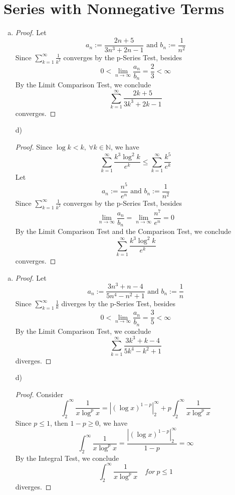 \documentclass{report}
\begin{document}
\section{Series with Nonnegative Terms}

\begin{Exercise}
\begin{enumerate}[a)]
\item 
\begin{proof}
Let $$a_n := \frac{2n+5}{3n^3+2n-1}\text{ and } b_n :=\frac{1}{n^2}$$
Since $\sum_{k=1}^{\infty}\frac{1}{k^2}$ converges by the p-Series Test, besides
$$0<\lim_{n\to\infty}\frac{a_n}{b_n} = \frac{2}{3} < \infty$$
By the Limit Comparison Test, we conclude $$\sum_{k=1}^{\infty}\frac{2k+5}{3k^3+2k-1}$$ converges.
\end{proof}

\item [d)]
\begin{proof}
Since $\log{k} < k,\ \forall k \in \mathbb{N}$, we have $$\sum_{k=1}^{\infty}\frac{k^3\log^2{k}}{e^k} \leq \sum_{k=1}^{\infty}\frac{k^5}{e^k}$$
Let $$a_n := \frac{n^5}{e^n}\text{ and } b_n :=\frac{1}{n^2}$$
Since $\sum_{k=1}^{\infty}\frac{1}{k^2}$ converges by the p-Series Test, besides
$$\lim_{n\to\infty}\frac{a_n}{b_n} = \lim_{n\to\infty}\frac{n^7}{e^n} = 0 $$
By the Limit Comparison Test and the Comparison Test, we conclude $$\sum_{k=1}^{\infty}\frac{k^3\log^2{k}}{e^k}$$ converges.
\end{proof}
\end{enumerate}
\end{Exercise}

\vspace{12pt}
\begin{Exercise}
\begin{enumerate}[a)]
\item 
\begin{proof}
Let $$a_n := \frac{3n^3+n-4}{5n^4-n^2+1}\text{ and } b_n :=\frac{1}{n}$$
Since $\sum_{k=1}^{\infty}\frac{1}{k}$ diverges by the p-Series Test, besides
$$0<\lim_{n\to\infty}\frac{a_n}{b_n} = \frac{3}{5} < \infty$$
By the Limit Comparison Test, we conclude $$\sum_{k=1}^{\infty}\frac{3k^3+k-4}{5k^4-k^2+1}$$ diverges.
\end{proof}

\item [d)]
\begin{proof}
Consider $$\int_{2}^{\infty}\frac{1}{x\log^p{x}} = \left|(\log{x})^{1-p}\right|_{2}^{\infty} + p\int_{2}^{\infty}\frac{1}{x\log^p{x}}$$
Since $p \leq 1$, then $1-p \geq 0$, we have $$\int_{2}^{\infty}\frac{1}{x\log^p{x}} = \frac{\left|(\log{x})^{1-p}\right|_{2}^{\infty}}{1-p} = \infty$$
By the Integral Test, we conclude $$\int_{2}^{\infty}\frac{1}{x\log^p{x}}\quad for\ p \leq 1$$
diverges.
\end{proof}
\end{enumerate}
\end{Exercise}
\end{document}
